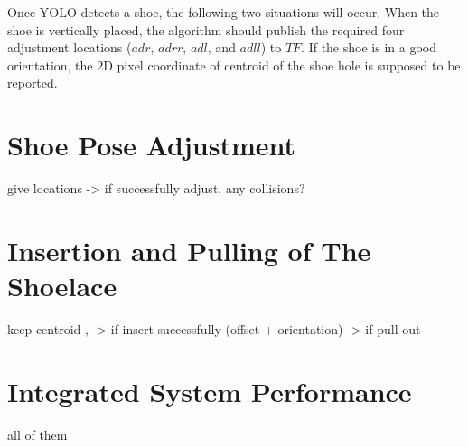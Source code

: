 Once YOLO detects a shoe, the following two situations will occur. When the shoe is vertically placed, the algorithm should publish the required four adjustment locations ($adr$, $adrr$, $adl$, and $adll$) to $TF$. If the shoe is in a good orientation, the 2D pixel coordinate of centroid of the shoe hole is supposed to be reported.

\begin{table}[H]
\centering
{}
\caption{}
\label{locationtest}
\end{table}


\section{Shoe Pose Adjustment}
give locations -> if successfully adjust, any collisions?

\section{Insertion and Pulling of The Shoelace}

keep centroid , -> if insert successfully (offset + orientation) -> if pull out

\section{Integrated System Performance}

all of them 
